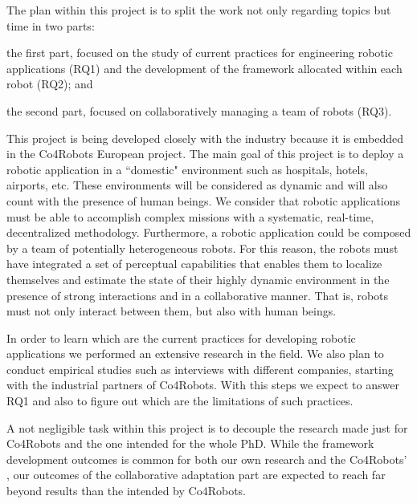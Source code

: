 The plan within this project is to split the work not only regarding topics but time in two parts:
\begin{enumerate*}
\item the first part, focused on the study of current practices for engineering robotic applications (RQ1) and the development of the framework allocated within each robot (RQ2); and
\item the second part, focused on collaboratively managing a team of robots (RQ3).
\end{enumerate*}

This project is being developed closely with the industry because it is embedded in the Co4Robots European project.
The main goal of this project is to deploy a robotic application in a ``domestic" environment such as hospitals, hotels, airports, etc.
These environments will be considered as dynamic and will also count with the presence of human beings.
We consider that robotic applications must be able to accomplish complex missions with a systematic, real-time, decentralized methodology.
Furthermore, a robotic application could be composed by a team of potentially heterogeneous robots.
For this reason, the robots must have integrated a set of perceptual capabilities that enables them to localize themselves and estimate the state of their highly dynamic environment in the presence of strong interactions and in a collaborative manner.
That is, robots must not only interact between them, but also with human beings.

In order to learn which are the current practices for developing robotic applications we performed an extensive research in the field.
We also plan to conduct empirical studies such as interviews with different companies, starting with the industrial partners of Co4Robots.
With this steps we expect to answer RQ1 and also to figure out which are the limitations of such practices.  

A not negligible task within this project is to decouple the research made just for Co4Robots and the one intended for the whole PhD.
While the framework development outcomes is common for both our own research and the Co4Robots' , our outcomes of the collaborative adaptation part are expected to reach far beyond results than the intended by Co4Robots.



